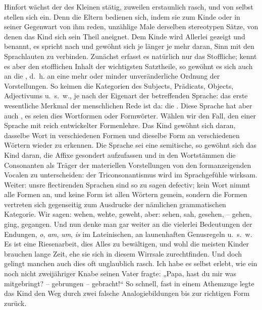 Hinfort wächst der  des Kleinen stätig, zuweilen erstaunlich rasch, und von selbst stellen sich  ein. Denn die Eltern bedienen sich, indem sie zum Kinde oder in seiner Gegenwart von ihm reden, unzählige Male derselben stereotypen Sätze, von denen das Kind sich sein Theil aneignet. Dem Kinde wird Allerlei gezeigt und benannt, es spricht nach und gewöhnt sich je länger je mehr daran, Sinn mit den Sprachlauten zu verbinden. Zunächst erfasst es natürlich nur das Stoffliche; kennt es aber den stofflichen Inhalt der wichtigsten Satztheile, so gewöhnt es sich auch an die , d.~h. an eine mehr oder minder unveränderliche Ordnung der Vorstellungen. So keimen die Kategorien des Subjects, Prädicats, Objects, Adjectivums u.~s.~w., je nach der Eigenart der betreffenden Sprache: das erste wesentliche Merkmal der menschlichen Rede ist da: die . Diese Sprache hat aber auch , es seien \label{fp.67} dies Wortformen oder Formwörter. Wählen wir den  Fall, den einer Sprache mit reich entwickelter Formenlehre. Das Kind gewöhnt sich daran, dasselbe Wort in verschiedenen Formen und dieselbe Form an verschiedenen Wörtern wieder zu erkennen. Die Sprache sei eine semitische, so gewöhnt sich das Kind daran, die Affixe gesondert aufzufassen und in den Wortstämmen die Consonanten als Träger der materiellen Vorstellungen von den formanzeigenden Vocalen zu unterscheiden: der Triconsonantismus wird im Sprachgefühle wirksam. Weiter: unsre flectirenden Sprachen sind so zu sagen defectiv; kein Wort nimmt alle Formen an, und keine Form ist allen Wörtern gemein, sondern die Formen vertreten sich gegenseitig zum Ausdrucke der nämlichen grammatischen Kategorie. Wir sagen: wehen, wehte, geweht, aber: sehen, sah, gesehen, – gehen, ging, gegangen. Und nun denke man gar weiter an die vielerlei Bedeutungen der Endungen, \textit{o}, \textit{am}, \textit{um}, \textit{is} im Lateinischen, an  launenhaften Genusregeln u.~s.~w. Es ist eine Riesenarbeit, dies Alles zu bewältigen, und wohl die meisten Kinder brauchen lange Zeit, ehe sie sich in diesem Wirrsale zurechtfinden. Und doch gelingt manchen auch dies oft unglaublich rasch. Ich habe es selbst erlebt, wie ein noch nicht zweijähriger Knabe seinen Vater fragte: „Papa, hast du mir was mitgebringt? – gebrungen – gebracht!“ So schnell, fast in einem Athemzuge legte das Kind den Weg durch zwei falsche Analogiebildungen bis zur richtigen Form zurück.


